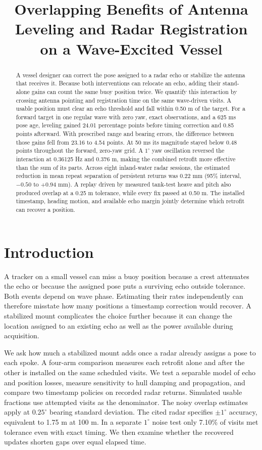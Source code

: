 \documentclass[nofoot]{asmeconf}
\title{Overlapping Benefits of Antenna Leveling and Radar Registration on a Wave-Excited Vessel}
\begin{document}
\maketitle
\begin{abstract}
A vessel designer can correct the pose assigned to a radar echo or stabilize the antenna that receives it. Because both interventions can relocate an echo, adding their stand-alone gains can count the same buoy position twice. We quantify this interaction by crossing antenna pointing and registration time on the same wave-driven visits. A usable position must clear an echo threshold and fall within 0.50 m of the target. For a forward target in one regular wave with zero yaw, exact observations, and a 625 ms pose age, leveling gained 24.01 percentage points before timing correction and 0.85 points afterward. With prescribed range and bearing errors, the difference between those gains fell from 23.16 to 4.54 points. At 50 ms its magnitude stayed below 0.48 points throughout the forward, zero-yaw grid. A $1^\circ$ yaw oscillation reversed the interaction at 0.36125 Hz and 0.376 m, making the combined retrofit more effective than the sum of its parts. Across eight inland-water radar sessions, the estimated reduction in mean repeat separation of persistent returns was 0.22 mm (95\% interval, $-0.50$ to $+0.94$ mm). A replay driven by measured tank-test heave and pitch also produced overlap at a 0.25 m tolerance, while every fix passed at 0.50 m. The installed timestamp, heading motion, and available echo margin jointly determine which retrofit can recover a position.
\end{abstract}

\section{Introduction}
A tracker on a small vessel can miss a buoy position because a crest attenuates the echo or because the assigned pose puts a surviving echo outside tolerance. Both events depend on wave phase. Estimating their rates independently can therefore misstate how many positions a timestamp correction would recover. A stabilized mount complicates the choice further because it can change the location assigned to an existing echo as well as the power available during acquisition.

We ask how much a stabilized mount adds once a radar already assigns a pose to each spoke. A four-arm comparison measures each retrofit alone and after the other is installed on the same scheduled visits. We test a separable model of echo and position losses, measure sensitivity to hull damping and propagation, and compare two timestamp policies on recorded radar returns. Simulated usable fractions use attempted visits as the denominator. The noisy overlap estimates apply at $0.25^\circ$ bearing standard deviation. The cited radar specifies $\pm1^\circ$ accuracy, equivalent to 1.75 m at 100 m. In a separate $1^\circ$ noise test only 7.10\% of visits met tolerance even with exact timing. We then examine whether the recovered updates shorten gaps over equal elapsed time.
\end{document}
